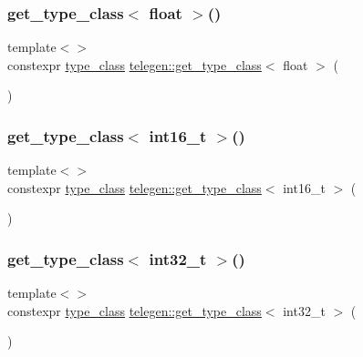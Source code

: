 \mbox{\label{namespacetelegen_a5268b4aae390befad50bb87802cc0b64}} 
\subsubsection{\texorpdfstring{get\+\_\+type\+\_\+class$<$ float $>$()}{get\_type\_class< float >()}}
{\footnotesize\ttfamily template$<$$>$ \\
constexpr \hyperlink{namespacetelegen_a72d4e69f0be1731e1a851a96dec858d8}{type\+\_\+class} \hyperlink{namespacetelegen_a6ea75c665a463a240f4a40419a810da3}{telegen\+::get\+\_\+type\+\_\+class}$<$ float $>$ (\begin{DoxyParamCaption}{ }\end{DoxyParamCaption})}

\mbox{\label{namespacetelegen_a79eff99045f75ea149a890f4938a831f}} 
\subsubsection{\texorpdfstring{get\+\_\+type\+\_\+class$<$ int16\+\_\+t $>$()}{get\_type\_class< int16\_t >()}}
{\footnotesize\ttfamily template$<$$>$ \\
constexpr \hyperlink{namespacetelegen_a72d4e69f0be1731e1a851a96dec858d8}{type\+\_\+class} \hyperlink{namespacetelegen_a6ea75c665a463a240f4a40419a810da3}{telegen\+::get\+\_\+type\+\_\+class}$<$ int16\+\_\+t $>$ (\begin{DoxyParamCaption}{ }\end{DoxyParamCaption})}

\mbox{\label{namespacetelegen_a446ea223e47eca730cb98b51f0c67a01}} 
\subsubsection{\texorpdfstring{get\+\_\+type\+\_\+class$<$ int32\+\_\+t $>$()}{get\_type\_class< int32\_t >()}}
{\footnotesize\ttfamily template$<$$>$ \\
constexpr \hyperlink{namespacetelegen_a72d4e69f0be1731e1a851a96dec858d8}{type\+\_\+class} \hyperlink{namespacetelegen_a6ea75c665a463a240f4a40419a810da3}{telegen\+::get\+\_\+type\+\_\+class}$<$ int32\+\_\+t $>$ (\begin{DoxyParamCaption}{ }\end{DoxyParamCaption})}

